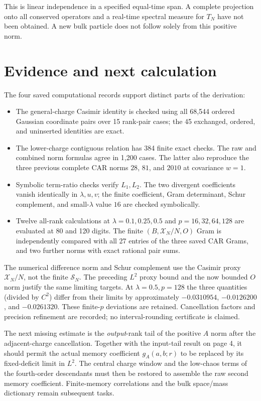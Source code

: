 \documentclass[11pt,a4paper]{article}
\begin{document}
This is linear independence in a specified equal-time span. A
complete projection onto all conserved operators and a real-time
spectral measure for $T_N$ have not been obtained. A new bulk
particle does not follow solely from this positive norm.

\newpage
\section{Evidence and next calculation}
The four saved computational records support distinct parts of the
derivation:
\begin{itemize}
 \item The general-charge Casimir identity is checked using all
 68,544 ordered Gaussian coordinate pairs over 15 rank-pair cases;
 the 45 exchanged, ordered, and uninserted identities are exact.
 \item The lower-charge contiguous relation has 384 finite exact
 checks. The raw and combined norm formulas agree in 1,200 cases.
 The latter also reproduce the three previous complete CAR norms
 $28$, $81$, and $2010$ at covariance $w=1$.
 \item Symbolic term-ratio checks verify $L_1,L_2$. The two
 divergent coefficients vanish identically in $\lambda,u,v$;
 the finite coefficient, Gram determinant, Schur complement,
 and small-$\lambda$ value $16$ are checked symbolically.
 \item Twelve all-rank calculations at $\lambda=0.1,0.25,0.5$
 and $p=16,32,64,128$ are evaluated at 80 and 120 digits.
 The finite $(B,\mathcal X_N/N,O)$ Gram is independently compared
 with all 27 entries of the three saved CAR Grams, and two
 further norms with exact rational pair sums.
\end{itemize}
The numerical difference norm and Schur complement use the
Casimir proxy $\mathcal X_N/N$, not the finite $\mathcal S_N$.
The preceding $L^2$ proxy bound and the now bounded $O$ norm
justify the same limiting targets. At $\lambda=0.5,p=128$ the
three quantities (divided by $C^2$) differ from their limits by
approximately $-0.0310954$, $-0.0126200$, and $-0.0261320$.
These finite-$p$ deviations are retained. Cancellation factors
and precision refinement are recorded; no interval-rounding
certificate is claimed.

The next missing estimate is the \emph{output}-rank tail of the
positive $A$ norm after the adjacent-charge cancellation. Together
with the input-tail result on page 4, it should permit the actual
memory coefficient $g_A(a,b;r)$ to be replaced by its fixed-deficit
limit in $L^2$. The central charge window and the low-chaos terms
of the fourth-order descendants must then be restored to assemble
the raw second memory coefficient. Finite-memory correlations and
the bulk space/mass dictionary remain subsequent tasks.
\end{document}

